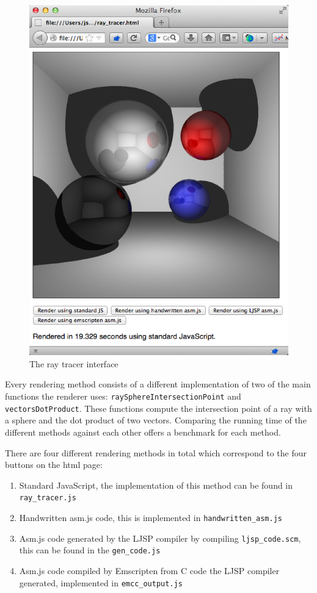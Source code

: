 \documentclass[11pt]{report}
\begin{document}
\begin{figure}[p]
\includegraphics[scale=0.7]{raytracinginterface.eps}
\caption{The ray tracer interface}
\label{raytracinginterface}
\end{figure}

Every rendering method consists of a different implementation of two of the main functions the renderer uses: \texttt{raySphereIntersectionPoint} and \texttt{vectorsDotProduct}. These functions compute the intersection point of a ray with a sphere and the dot product of two vectors. Comparing the running time of the different methods against each other offers a benchmark for each method.

There are four different rendering methods in total which correspond to the four buttons on the html page:

\begin{enumerate}
\item Standard JavaScript, the implementation of this method can be found in \texttt{ray_tracer.js}
\item Handwritten asm.js code, this is implemented in \texttt{handwritten_asm.js}
\item Asm.js code generated by the LJSP compiler by compiling \texttt{ljsp_code.scm}, this can be found in the \texttt{gen_code.js}
\item Asm.js code compiled by Emscripten from C code the LJSP compiler generated, implemented in \texttt{emcc_output.js}
\end{enumerate}
\end{document}
